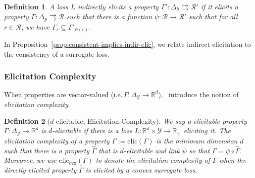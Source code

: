 \documentclass{article}
\newcommand{\reals}{\mathbb{R}}
\newcommand{\simplex}{\Delta_\Y}
\newcommand{\elic}{\mathrm{elic}}
\newcommand{\eliccvx}{\mathrm{elic}_\mathrm{cvx}}
\newcommand{\R}{\mathcal{R}}
\newcommand{\Y}{\mathcal{Y}}
\newcommand{\toto}{\rightrightarrows}
\newtheorem{definition}{Definition}
\begin{document}
\begin{definition}\label{def:indirectly-elicits}
	A loss $L$ \emph{indirectly elicits} a property $\Gamma':\simplex \toto \R'$ if it elicits a property $\Gamma: \simplex \toto \R$ such that there is a function $\psi:\R \to \R'$ such that for all $r \in \R$, we have $\Gamma_r \subseteq \Gamma'_{\psi(r)}$.
\end{definition}

In Proposition~\ref{prop:consistent-implies-indir-elic}, we relate indirect elicitation to the consistency of a surrogate loss.

\subsubsection{Elicitation Complexity}
When properties are vector-valued (i.e.$\, \Gamma: \simplex \to \reals^d$),~\cite{frongillo2015elicitation} introduce the notion of \emph{elicitation complexity}.

\begin{definition}[$d$-elicitable, Elicitation Complexity]
	We say a elicitable property $\Gamma:\simplex \to \reals^d$ is $d$-elicitable if there is a loss $L : \reals^d \times \Y \to \reals_+$ eliciting it.
	The \emph{elicitation complexity} of a property $\Gamma := \elic(\Gamma)$ is the minimum dimension $d$ such that there is a property $\hat \Gamma$ that is $d$-elicitable and link $\psi$ so that $\Gamma = \psi \circ \hat \Gamma$.
	Moreover, we use $\eliccvx(\Gamma)$ to denote the elicitation complexity of $\Gamma$ when the directly elicited property $\hat \Gamma$ is elicited by a \emph{convex} surrogate loss.
\end{definition}


\iffalse
\begin{definition}[Identifiable]
	A property $\Gamma: \simplex \to \R$ is \emph{identifiable} if there is a function $V: \R \times\Y \to \reals$ such that 
	\begin{equation*}
	\forall p \in \simplex, \; r \in \Gamma(p) \iff V(r) = \vec 0~.~
	\end{equation*}
\end{definition}
\fi

\iffalse
Similarly, we can consider the notion of \emph{identifiability} for vector-valued properties.

\begin{definition}[$d$-identifiable, Identification Complexity]
	A vector-valued property $\Gamma: \simplex \to \reals^d$ is $d$-identifiable if it holds that $p \in \Gamma_u \iff V(u, p) = \vec 0 \in \reals^d$.
	Like elicitation complexity, we define the \emph{identification complexity} of a property $\Gamma$ as the minimum dimension $d$ such that there is a link $\psi$ such that $\Gamma = \psi \circ \hat \Gamma$ and $\hat \Gamma$ is $d$-identifiable.
\end{definition}
\fi
\end{document}
